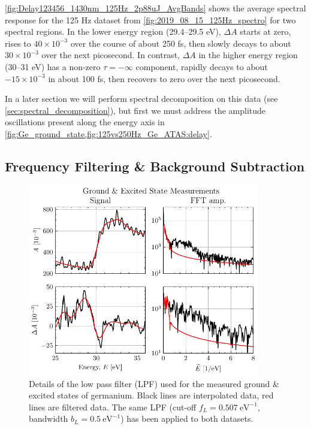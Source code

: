 \cref{fig:Delay123456_1430nm_125Hz_2p88uJ_AvgBands} shows the average spectral response for the 125 Hz dataset from \cref{fig:2019_08_15_125Hz_spectro} for two spectral regions. In the lower energy region (29.4--29.5 eV), $\Delta A$ starts at zero, rises to $40 \times 10^{-3}$ over the course of about 250 fs, then slowly decays to about $30 \times 10^{-3}$ over the next picosecond. In contrast, $\Delta A$ in the higher energy region (30--31 eV) has a non-zero $\tau=-\infty$ component, rapidly decays to about $-15 \times 10^{-3}$ in about 100 fs, then recovers to zero over the next picosecond.

In a later section we will perform spectral decomposition on this data (see \cref{sec:spectral_decomposition}), but first we must address the amplitude oscillations present along the energy axis in \cref{fig:Ge_ground_state,fig:125vs250Hz_Ge_ATAS:delay}.

\subsection{Frequency Filtering \& Background Subtraction}
\label{sec:freq_filt}

\begin{figure}
	\centering
	\includegraphics[width=0.9\textwidth]{figures/chap4/unfiltered_A_dA.pdf}
	\caption{Details of the low pass filter (LPF) used for the measured ground \& excited states of germanium. Black lines are interpolated data, red lines are filtered data. The same LPF (cut-off $f_L = 0.507 \ \textrm{eV}^{-1}$, bandwidth $b_L = 0.5 \ \textrm{eV}^{-1}$) has been applied to both datasets.}
	\label{fig:unfiltered_A_dA}
\end{figure}


